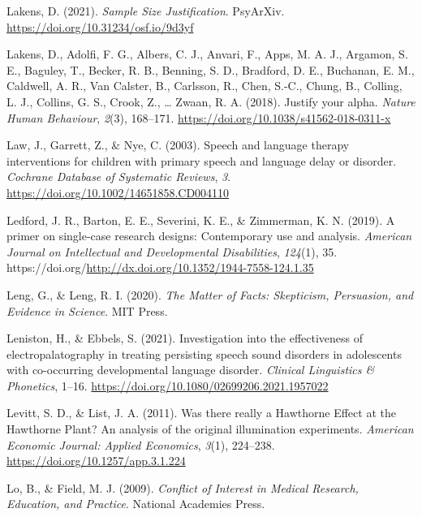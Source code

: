 \documentclass{krantz}
\newlength{\cslhangindent}
\newlength{\cslentryspacingunit} %
\newenvironment{CSLReferences}[2] %
{%
\setlength{\parindent}{0pt}
\ifodd #1
\let\oldpar\par
\def\par{\hangindent=\cslhangindent\oldpar}
\fi
\setlength{\parskip}{#2\cslentryspacingunit}
}%
{}
\begin{document}
\begin{CSLReferences}{1}{0}
\leavevmode{}%
Lakens, D. (2021). \emph{Sample {Size Justification}}. {PsyArXiv}. \url{https://doi.org/10.31234/osf.io/9d3yf}

\leavevmode{}%
Lakens, D., Adolfi, F. G., Albers, C. J., Anvari, F., Apps, M. A. J., Argamon, S. E., Baguley, T., Becker, R. B., Benning, S. D., Bradford, D. E., Buchanan, E. M., Caldwell, A. R., Van Calster, B., Carlsson, R., Chen, S.-C., Chung, B., Colling, L. J., Collins, G. S., Crook, Z., \ldots{} Zwaan, R. A. (2018). Justify your alpha. \emph{Nature Human Behaviour}, \emph{2}(3), 168--171. \url{https://doi.org/10.1038/s41562-018-0311-x}

\leavevmode{}%
Law, J., Garrett, Z., \& Nye, C. (2003). Speech and language therapy interventions for children with primary speech and language delay or disorder. \emph{Cochrane Database of Systematic Reviews}, \emph{3}. \url{https://doi.org/10.1002/14651858.CD004110}

\leavevmode{}%
Ledford, J. R., Barton, E. E., Severini, K. E., \& Zimmerman, K. N. (2019). A primer on single-case research designs: {Contemporary} use and analysis. \emph{American Journal on Intellectual and Developmental Disabilities}, \emph{124}(1), 35. https://doi.org/\url{http://dx.doi.org/10.1352/1944-7558-124.1.35}

\leavevmode{}%
Leng, G., \& Leng, R. I. (2020). \emph{The {Matter} of {Facts}: {Skepticism}, {Persuasion}, and {Evidence} in {Science}}. {MIT Press}.

\leavevmode{}%
Leniston, H., \& Ebbels, S. (2021). Investigation into the effectiveness of electropalatography in treating persisting speech sound disorders in adolescents with co-occurring developmental language disorder. \emph{Clinical Linguistics \& Phonetics}, 1--16. \url{https://doi.org/10.1080/02699206.2021.1957022}

\leavevmode{}%
Levitt, S. D., \& List, J. A. (2011). Was there really a {Hawthorne Effect} at the {Hawthorne Plant}? {An} analysis of the original illumination experiments. \emph{American Economic Journal: Applied Economics}, \emph{3}(1), 224--238. \url{https://doi.org/10.1257/app.3.1.224}

\leavevmode{}%
Lo, B., \& Field, M. J. (2009). \emph{Conflict of {Interest} in {Medical Research}, {Education}, and {Practice}}. {National Academies Press}.


\end{CSLReferences}
\end{document}
